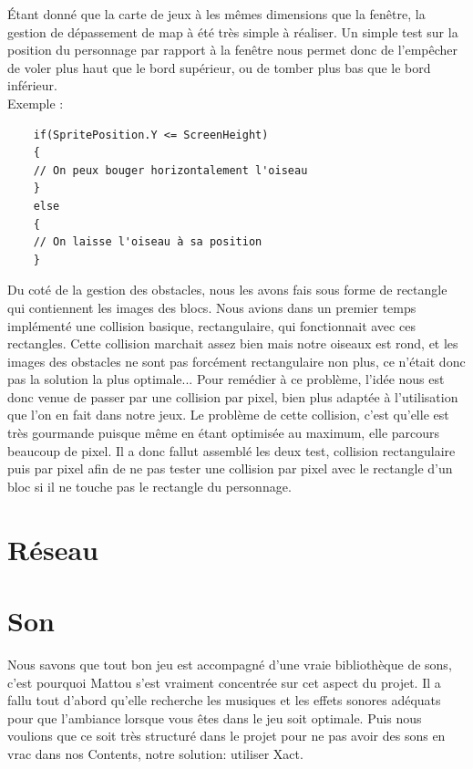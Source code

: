 \documentclass [11pt]{report}
\begin{document}
		\indent Étant donné que la carte de jeux à les mêmes dimensions que la fenêtre, la gestion de dépassement de map à été très simple à réaliser. Un simple test sur la position du personnage par rapport à la fenêtre nous permet donc de l'empêcher de voler plus haut que le bord supérieur, ou de tomber plus bas que le bord inférieur. \\
		
		Exemple :
		
		\begin{Verbatim}
	if(SpritePosition.Y <= ScreenHeight)
	{
	// On peux bouger horizontalement l'oiseau
	}
	else
	{
	// On laisse l'oiseau à sa position
	}
		\end{Verbatim}
		
				
		\indent Du coté de la gestion des obstacles, nous les avons fais sous forme de rectangle qui contiennent les images des blocs. Nous avions dans un premier temps implémenté une collision basique, rectangulaire, qui fonctionnait avec ces rectangles. Cette collision marchait assez bien mais notre oiseaux est rond, et les images des obstacles ne sont pas forcément rectangulaire non plus, ce n'était donc pas la solution la plus optimale... 
		Pour remédier à ce problème, l'idée nous est donc venue de passer par une collision par pixel, bien plus adaptée à l'utilisation que l'on en fait dans notre jeux. Le problème de cette collision, c'est qu'elle est très gourmande puisque même en étant optimisée au maximum, elle parcours beaucoup de pixel. Il a donc fallut assemblé les deux test, collision rectangulaire puis par pixel afin de ne pas tester une collision par pixel avec le rectangle d'un bloc si il ne touche pas le rectangle du personnage.
		
		
	\section{Réseau}
	
	
	
	

	\section{Son}
	Nous savons que tout bon jeu est accompagné d'une vraie bibliothèque de sons, c'est pourquoi Mattou s'est vraiment concentrée sur cet aspect du projet. Il a fallu tout d'abord qu'elle recherche les musiques et les effets sonores adéquats pour que l'ambiance lorsque vous êtes dans le jeu soit optimale. Puis nous voulions que ce soit très structuré dans le projet pour ne pas avoir des sons en vrac dans nos Contents, notre solution: utiliser Xact. 
	
\end{document}
